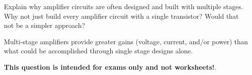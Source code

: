 

Explain why amplifier circuits are often designed and built with multiple stages.  Why not just build every amplifier circuit with a single transistor?  Would that not be a simpler approach?







Multi-stage amplifiers provide greater gains (voltage, current, and/or power) than what could be accomplished through single stage designs alone.







{\bf This question is intended for exams only and not worksheets!}.




